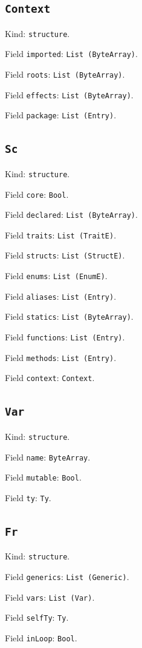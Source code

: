 \documentclass[11pt]{article}
\begin{document}
\subsection*{\texttt{Context}}
\noindent Kind: \texttt{structure}.\par
\noindent Field \texttt{imported}: \texttt{List (ByteArray)}.\par
\noindent Field \texttt{roots}: \texttt{List (ByteArray)}.\par
\noindent Field \texttt{effects}: \texttt{List (ByteArray)}.\par
\noindent Field \texttt{package}: \texttt{List (Entry)}.\par
\subsection*{\texttt{Sc}}
\noindent Kind: \texttt{structure}.\par
\noindent Field \texttt{core}: \texttt{Bool}.\par
\noindent Field \texttt{declared}: \texttt{List (ByteArray)}.\par
\noindent Field \texttt{traits}: \texttt{List (TraitE)}.\par
\noindent Field \texttt{structs}: \texttt{List (StructE)}.\par
\noindent Field \texttt{enums}: \texttt{List (EnumE)}.\par
\noindent Field \texttt{aliases}: \texttt{List (Entry)}.\par
\noindent Field \texttt{statics}: \texttt{List (ByteArray)}.\par
\noindent Field \texttt{functions}: \texttt{List (Entry)}.\par
\noindent Field \texttt{methods}: \texttt{List (Entry)}.\par
\noindent Field \texttt{context}: \texttt{Context}.\par
\subsection*{\texttt{Var}}
\noindent Kind: \texttt{structure}.\par
\noindent Field \texttt{name}: \texttt{ByteArray}.\par
\noindent Field \texttt{mutable}: \texttt{Bool}.\par
\noindent Field \texttt{ty}: \texttt{Ty}.\par
\subsection*{\texttt{Fr}}
\noindent Kind: \texttt{structure}.\par
\noindent Field \texttt{generics}: \texttt{List (Generic)}.\par
\noindent Field \texttt{vars}: \texttt{List (Var)}.\par
\noindent Field \texttt{selfTy}: \texttt{Ty}.\par
\noindent Field \texttt{inLoop}: \texttt{Bool}.\par
\end{document}
